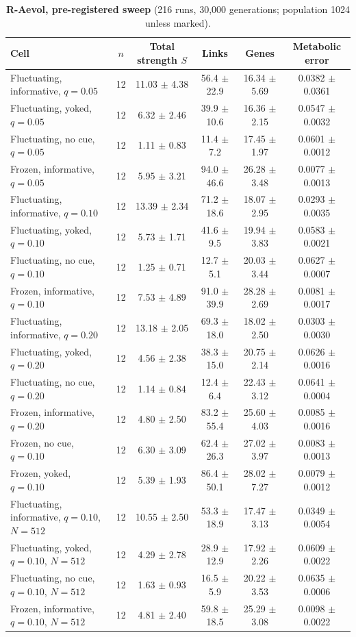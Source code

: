 \begin{table}[!ht]\small
\caption{\textbf{R-Aevol, pre-registered sweep} (216 runs, 30{,}000 generations; population 1024 unless marked).}
\begin{tabular}{@{}lccccc@{}}\toprule
Cell & $n$ & Total strength $S$ & Links & Genes & Metabolic error\\\midrule
Fluctuating, informative, $q=0.05$ & 12 & 11.03 $\pm$ 4.38 & 56.4 $\pm$ 22.9 & 16.34 $\pm$ 5.69 & 0.0382 $\pm$ 0.0361\\
Fluctuating, yoked, $q=0.05$ & 12 & 6.32 $\pm$ 2.46 & 39.9 $\pm$ 10.6 & 16.36 $\pm$ 2.15 & 0.0547 $\pm$ 0.0032\\
Fluctuating, no cue, $q=0.05$ & 12 & 1.11 $\pm$ 0.83 & 11.4 $\pm$ 7.2 & 17.45 $\pm$ 1.97 & 0.0601 $\pm$ 0.0012\\
Frozen, informative, $q=0.05$ & 12 & 5.95 $\pm$ 3.21 & 94.0 $\pm$ 46.6 & 26.28 $\pm$ 3.48 & 0.0077 $\pm$ 0.0013\\
Fluctuating, informative, $q=0.10$ & 12 & 13.39 $\pm$ 2.34 & 71.2 $\pm$ 18.6 & 18.07 $\pm$ 2.95 & 0.0293 $\pm$ 0.0035\\
Fluctuating, yoked, $q=0.10$ & 12 & 5.73 $\pm$ 1.71 & 41.6 $\pm$ 9.5 & 19.94 $\pm$ 3.83 & 0.0583 $\pm$ 0.0021\\
Fluctuating, no cue, $q=0.10$ & 12 & 1.25 $\pm$ 0.71 & 12.7 $\pm$ 5.1 & 20.03 $\pm$ 3.44 & 0.0627 $\pm$ 0.0007\\
Frozen, informative, $q=0.10$ & 12 & 7.53 $\pm$ 4.89 & 91.0 $\pm$ 39.9 & 28.28 $\pm$ 2.69 & 0.0081 $\pm$ 0.0017\\
Fluctuating, informative, $q=0.20$ & 12 & 13.18 $\pm$ 2.05 & 69.3 $\pm$ 18.0 & 18.02 $\pm$ 2.50 & 0.0303 $\pm$ 0.0030\\
Fluctuating, yoked, $q=0.20$ & 12 & 4.56 $\pm$ 2.38 & 38.3 $\pm$ 15.0 & 20.75 $\pm$ 2.14 & 0.0626 $\pm$ 0.0016\\
Fluctuating, no cue, $q=0.20$ & 12 & 1.14 $\pm$ 0.84 & 12.4 $\pm$ 6.4 & 22.43 $\pm$ 3.12 & 0.0641 $\pm$ 0.0004\\
Frozen, informative, $q=0.20$ & 12 & 4.80 $\pm$ 2.50 & 83.2 $\pm$ 55.4 & 25.60 $\pm$ 4.03 & 0.0085 $\pm$ 0.0016\\
Frozen, no cue, $q=0.10$ & 12 & 6.30 $\pm$ 3.09 & 62.4 $\pm$ 26.3 & 27.02 $\pm$ 3.97 & 0.0083 $\pm$ 0.0013\\
Frozen, yoked, $q=0.10$ & 12 & 5.39 $\pm$ 1.93 & 86.4 $\pm$ 50.1 & 28.02 $\pm$ 7.27 & 0.0079 $\pm$ 0.0012\\
Fluctuating, informative, $q=0.10$, $N=512$ & 12 & 10.55 $\pm$ 2.50 & 53.3 $\pm$ 18.9 & 17.47 $\pm$ 3.13 & 0.0349 $\pm$ 0.0054\\
Fluctuating, yoked, $q=0.10$, $N=512$ & 12 & 4.29 $\pm$ 2.78 & 28.9 $\pm$ 12.9 & 17.92 $\pm$ 2.26 & 0.0609 $\pm$ 0.0022\\
Fluctuating, no cue, $q=0.10$, $N=512$ & 12 & 1.63 $\pm$ 0.93 & 16.5 $\pm$ 5.9 & 20.22 $\pm$ 3.53 & 0.0635 $\pm$ 0.0006\\
Frozen, informative, $q=0.10$, $N=512$ & 12 & 4.81 $\pm$ 2.40 & 59.8 $\pm$ 18.5 & 25.29 $\pm$ 3.08 & 0.0098 $\pm$ 0.0022\\
\bottomrule\end{tabular}\end{table}

